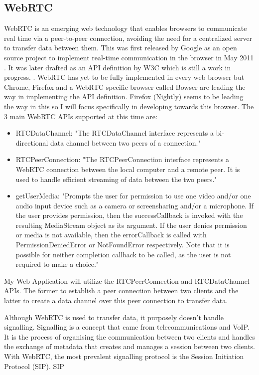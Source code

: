 \documentclass[]{report}
\begin{document}
		\subsection*{WebRTC}
			WebRTC is an emerging web technology that enables browsers to communicate real time via a peer-to-peer connection, avoiding the need for a centralized server to transfer data between them. This was first released by Google as an open source project to implement real-time communication in the browser in May 2011 \cite{Google WebRTC Release}. It was later drafted as an API definition by W3C which is still a work in progress. \cite{W3C WebRTC Definition}. WebRTC has yet to be fully implemented in every web browser but Chrome, Firefox and a WebRTC specific browser called Bowser are leading the way in implementing the API definition. Firefox (Nightly) seems to be leading the way in this so I will focus specifically in developing towards this browser\cite{WebRTC browser support}.
			The 3 main WebRTC APIs supported at this time are:
				\begin{itemize}
					\item RTCDataChannel:
					"The RTCDataChannel interface represents a bi-directional data channel between two peers of a connection." \cite{Mozilla Web API} 
					\item RTCPeerConnection:
					"The RTCPeerConnection interface represents a WebRTC connection between the local computer and a remote peer. It is used to handle efficient streaming of data between the two peers." 
					\cite{Mozilla Web API} 
					\item getUserMedia:
					"Prompts the user for permission to use one video and/or one audio input device such as a camera or screensharing and/or a microphone. If the user provides permission, then the successCallback is invoked with the resulting MediaStream object as its argument. If the user denies permission or media is not available, then the errorCallback is called with PermissionDeniedError or NotFoundError respectively. Note that it is possible for neither completion callback to be called, as the user is not required to make a choice."
					\cite{Mozilla Web API} 
				\end{itemize}
			My Web Application will utilize the RTCPeerConnection and RTCDataChannel APIs. The former to establish a peer connection between two clients and the latter to create a data channel over this peer connection to transfer data.
			
			Although WebRTC is used to transfer data, it purposely doesn't handle signalling. Signalling is a concept that came from telecommunications and VoIP. It is the process of organising the communication between two clients and handles the exchange of metadata that creates and manages a session between two clients. With WebRTC, the most prevalent signalling protocol is the Session Initiation Protocol (SIP). SIP 
				
\end{document}
